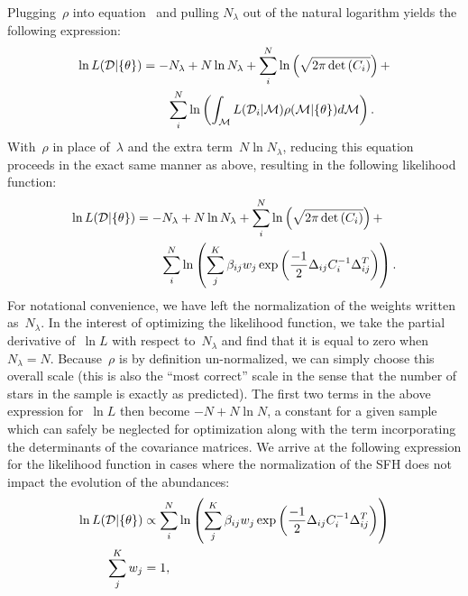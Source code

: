 \documentclass[foo.tex]{subfiles}
\begin{document}
Plugging~$\rho$ into equation~ and pulling
$N_\lambda$ out of the natural logarithm yields the following expression:
\begin{equation}\begin{split}
\ln L(\mathcal{D} | \{\theta\}) &= -N_\lambda + N \ln N_\lambda +
\sum_i^N \ln \left(\sqrt{2\pi \det{(C_i)}}\right) +
\\
&\qquad \sum_i^N \ln \left(
\int_{\mathcal{M}} L(\mathcal{D}_i | \mathcal{M}) \rho(\mathcal{M} | \{\theta\})
d\mathcal{M} \right).
\end{split}\end{equation}
With~$\rho$ in place of~$\lambda$ and the extra term~$N \ln N_\lambda$,
reducing this equation proceeds in the exact same manner as above, resulting
in the following likelihood function:
\begin{equation}\begin{split}
\ln L(\mathcal{D} | \{\theta\}) &= -N_\lambda + N \ln N_\lambda +
\sum_i^N \ln \left(\sqrt{2\pi \det{(C_i)}}\right) +
\\
&\qquad \sum_i^N \ln \left(
\sum_j^K \beta_{ij} w_j
\exp\left(\frac{-1}{2}\Delta_{ij} C_i^{-1} \Delta_{ij}^T\right)\right).
\end{split}\end{equation}
For notational convenience, we have left the normalization of the weights
written as~$N_\lambda$.
In the interest of optimizing the likelihood function, we take the partial
derivative of~$\ln L$ with respect to~$N_\lambda$ and find that it is equal to
zero when~$N_\lambda = N$.
Because~$\rho$ is by definition un-normalized, we can simply choose this
overall scale (this is also the ``most correct'' scale in the sense that the
number of stars in the sample is exactly as predicted).
The first two terms in the above expression for~$\ln L$ then become
$-N + N \ln N$, a constant for a given sample which can safely be neglected
for optimization along with the term incorporating the determinants of the
covariance matrices.
We arrive at the following expression for the likelihood function in cases
where the normalization of the SFH does not impact the evolution of the
abundances:
\begin{subequations}\begin{align}
\ln L(\mathcal{D} | \{\theta\}) &\propto \sum_i^N \ln \left( \sum_j^K \beta_{ij}
w_j \exp\left(\frac{-1}{2}\Delta_{ij} C_i^{-1} \Delta_{ij}^T\right) \right)
\label{eq:lnL_fracweight}
\\
\sum_j^K w_j &= 1,
\label{eq:lnL_fracweightsum}
\end{align}\end{subequations}
\end{document}
